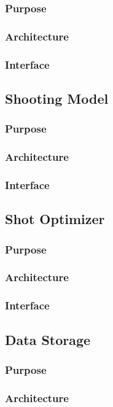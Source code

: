 \documentclass[11pt]{article}
\begin{document}
\subsubsection*{Purpose}
\subsubsection*{Architecture}
\subsubsection*{Interface}

\subsection{Shooting Model}
\subsubsection*{Purpose}
\subsubsection*{Architecture}
\subsubsection*{Interface}

\subsection{Shot Optimizer}
\subsubsection*{Purpose}
\subsubsection*{Architecture}
\subsubsection*{Interface}

\subsection{Data Storage}
\subsubsection*{Purpose}
\subsubsection*{Architecture}
\end{document}
